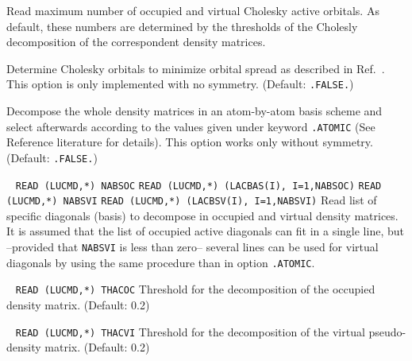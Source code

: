 \begin{description}
       Read maximum number of occupied and virtual Cholesky active
       orbitals. As default, these numbers are determined by the 
       thresholds of the Cholesly decomposition of the correspondent
       density matrices.
%
\item[\Key{MINSPR}] 
       Determine Cholesky orbitals to minimize orbital spread as 
       described in Ref.~\cite{ziolkowski2009}. This option is only
        implemented with no symmetry.
        (Default: \verb|.FALSE.|)
%
\item[\Key{NOSLDR}] 
        Decompose the whole density matrices in an atom-by-atom
        basis scheme and select afterwards according to the values
        given under keyword \verb|.ATOMIC| (See Reference literature
        for details). This option works only without symmetry.
        (Default: \verb|.FALSE.|)
%
\item[\Key{SELDIA}] \verb| |\newline
\verb|READ (LUCMD,*) NABSOC|\newline
\verb|READ (LUCMD,*) (LACBAS(I), I=1,NABSOC)|\newline
\verb|READ (LUCMD,*) NABSVI|\newline
\verb|READ (LUCMD,*) (LACBSV(I), I=1,NABSVI)|\newline
        Read list of specific diagonals (basis) to decompose in 
        occupied and virtual density matrices. It is assumed that
        the list of occupied active diagonals can fit in a single 
        line, but –provided that \verb|NABSVI| is less than zero–
        several lines can be used for virtual diagonals by
        using the same procedure than in option \verb|.ATOMIC|.
%
\item[\Key{THACOC}] \verb| |\newline
\verb|READ (LUCMD,*) THACOC|\newline
       Threshold for the decomposition of the occupied density matrix.
       (Default: 0.2)
%
\item[\Key{THACVI}] \verb| |\newline
\verb|READ (LUCMD,*) THACVI|\newline
       Threshold for the decomposition of the virtual
       pseudo-density matrix.  (Default: 0.2)
%
%
\end{description}
